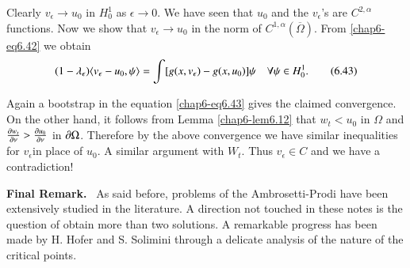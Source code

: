 Clearly $v_{\epsilon}\to u_{0}$ in $H^{1}_{0}$ as $\epsilon\to 0$. We
have seen that $u_{0}$ and the $v_{\epsilon}$'s are $C^{2,\alpha}$
functions. Now we show that $v_{\epsilon}\to u_{0}$ in the norm of
$C^{1,\alpha}(\overline{\Omega})$. From \eqref{chap6-eq6.42} we obtain
\begin{equation*}
(1-\lambda_{\epsilon})\langle v_{\epsilon}-u_{0},\psi\rangle =\int
  [g(x,v_{\epsilon})-g(x,u_{0})]\psi\quad \forall \psi \in
  H^{1}_{0}.\tag{6.43}\label{chap6-eq6.43} 
\end{equation*}

Again a bootstrap in the equation \eqref{chap6-eq6.43} gives the
claimed convergence. On the other hand, it follows from Lemma
\ref{chap6-lem6.12} that $w_{t}<u_{0}$ in $\Omega$ and $\frac{\partial
  w_{t}}{\partial \nu}>\frac{\partial u_{0}}{\partial\nu}$ in $\partial\Omega$. Therefore by
the above convergence we have similar inequalities for
$v_{\epsilon}$\pageoriginale in place of $u_{0}$. A similar argument
with $W_{t}$. Thus $v_{\epsilon}\in C$ and we have a contradiction!

\medskip
\noindent
{\bf Final Remark.}~ As said before, problems of the Ambrosetti-Prodi
have been extensively studied in the literature. A direction not
touched in these notes is the question of obtain more than two
solutions. A remarkable progress has been made by H. Hofer and
S. Solimini through a delicate analysis of the nature of the critical
points. 

